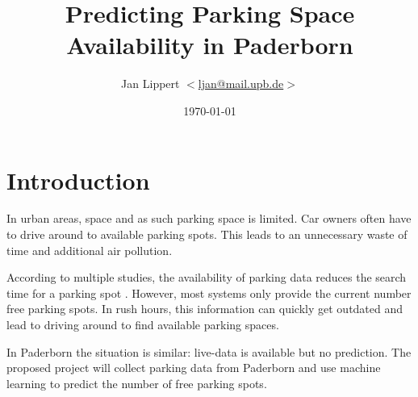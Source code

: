 \documentclass[journal,10pt]{IEEEtran}
\title{Predicting Parking Space Availability in Paderborn}
\author{Jan Lippert \(<\)\href{mailt:ljan@mail.upb.de}{ljan@mail.upb.de}\(>\)}
\date{\today}
\begin{document}
\maketitle

\section{Introduction}

In urban areas, space and as such parking space is limited. Car owners often have to drive around to available parking spots. This leads to an unnecessary waste of time and additional air pollution. 

According to multiple studies, the availability of parking data reduces the search time for a parking spot \cite{Asakura1994}\cite{Caicedo2010228}. However, most systems only provide the current number free parking spots. In rush hours, this information can quickly get outdated and lead to driving around to find available parking spaces.


In Paderborn the situation is similar: live-data is available but no prediction. The proposed project will collect parking data from Paderborn and use machine learning to predict the number of free parking spots.







\end{document}
